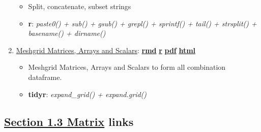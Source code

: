 \documentclass[
]{book}
\providecommand{\tightlist}{%
  \setlength{\itemsep}{0pt}\setlength{\parskip}{0pt}}
\begin{document}
\begin{enumerate}
  \begin{itemize}
  \tightlist
  \item
    Split, concatenate, subset strings
  \item
    \textbf{r}: \emph{paste0() + sub() + gsub() + grepl() + sprintf() + tail() + strsplit() + basename() + dirname()}
  \end{itemize}
\item
  \href{https://fanwangecon.github.io/R4Econ/amto/array/htmlpdfr/fs_ary_mesh.html}{Meshgrid Matrices, Arrays and Scalars}: \href{https://github.com/FanWangEcon/R4Econ/blob/master/amto/array//fs_ary_mesh.Rmd}{\textbf{rmd}} \textbar{} \href{https://github.com/FanWangEcon/R4Econ/blob/master/amto/array/htmlpdfr/fs_ary_mesh.R}{\textbf{r}} \textbar{} \href{https://github.com/FanWangEcon/R4Econ/blob/master/amto/array/htmlpdfr/fs_ary_mesh.pdf}{\textbf{pdf}} \textbar{} \href{https://fanwangecon.github.io/R4Econ/amto/array/htmlpdfr/fs_ary_mesh.html}{\textbf{html}}

  \begin{itemize}
  \tightlist
  \item
    Meshgrid Matrices, Arrays and Scalars to form all combination dataframe.
  \item
    \textbf{tidyr}: \emph{expand\_grid() + expand.grid()}
  \end{itemize}
\end{enumerate}

\hypertarget{section-1.3-matrixmatrix-links}{%
\subsection{\texorpdfstring{\protect\hyperlink{matrix}{Section 1.3 Matrix} links}{Section 1.3 Matrix links}}\label{section-1.3-matrixmatrix-links}}
\end{document}

